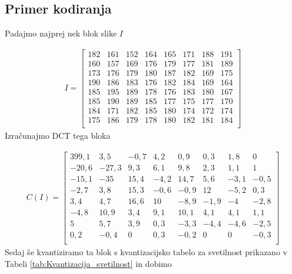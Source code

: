 \documentclass[a4paper,12pt,openright]{book}
\begin{document}
\subsection{Primer kodiranja}
Padajmo najprej nek blok slike \(I\)

\begin{gather*}
 I =
  \begin{bmatrix}
 182& 161& 152& 164& 165& 171& 188& 191\\
 160& 157& 169& 176& 179& 177& 181& 189\\
 173& 176& 179& 180& 187& 182& 169& 175\\
 190& 186& 183& 176& 182& 184& 169& 164\\
 185& 195& 189& 178& 176& 183& 180& 167\\
 185& 190& 189& 185& 177& 175& 177& 170\\
 184& 171& 182& 185& 180& 174& 172& 174\\
 175& 186& 179& 178& 180& 182& 181& 184\\
   \end{bmatrix}
\end{gather*}
Izračunajmo DCT tega bloka

\begin{gather}
 C(I) =
  \begin{bmatrix}
 399,1&   3,5&  -0,7&   4,2&   0,9&   0,3&   1,8&   0 \\
 -20,6& -27,3&   9,3&   6,1&   9,8&   2,3&   1,1&   1 \\
 -15,1& -35 &  15,4&  -4,2&  14,7&   5,6&  -3,1&  -0,5\\
  -2,7&   3,8&  15,3&  -0,6&  -0,9&  12 &  -5,2&   0,3\\
   3,4&   4,7&  16,6&  10 &  -8,9&  -1,9&  -4 &  -2,8\\
  -4,8&  10,9&   3,4&   9,1&  10,1&   4,1&   4,1&   1,1\\
   5 &   5,7&   3,9&   0,3&  -3,3&  -4,4&  -4,6&  -2,5\\
   0,2&  -0,4&  0 &   0,3&  -0,2&  0 &  0 &  -0,3\\
   \end{bmatrix}
\end{gather}
Sedaj še kvantiziramo ta blok s kvantizacijsko tabelo za svetilnost prikazano v Tabeli \ref{tab:Kvantizacija_svetilnost} in dobimo
\end{document}
